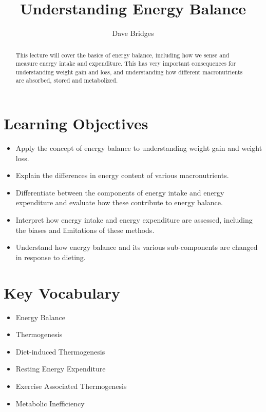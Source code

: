 \documentclass{tufte-handout}
\title{Understanding Energy Balance}
\author{Dave Bridges}
\date{}  %
\begin{document}
\maketitle%

\begin{abstract}
\noindent This lecture will cover the basics of energy balance, including how we sense and measure energy intake and expenditure.  This has very important consequences for understanding weight gain and loss, and understanding how different macronutrients are absorbed, stored and metabolized.
\end{abstract}

\tableofcontents

\pagebreak
\section{Learning Objectives}

\begin{itemize}
\item Apply the concept of energy balance to understanding weight gain and weight loss.
\item Explain the differences in energy content of various macronutrients.
\item Differentiate between the components of energy intake and energy expenditure and evaluate how these contribute to energy balance.
\item Interpret how energy intake and energy expenditure are assessed, including the biases and limitations of these methods.
\item Understand how energy balance and its various sub-components are changed in response to dieting.

\end{itemize}

\section{Key Vocabulary}
\begin{itemize}
	\item Energy Balance
	\item Thermogenesis
	\item Diet-induced Thermogenesis
	\item Resting Energy Expenditure
	\item Exercise Associated Thermogenesis
	\item Metabolic Inefficiency

\end{itemize}
\end{document}
